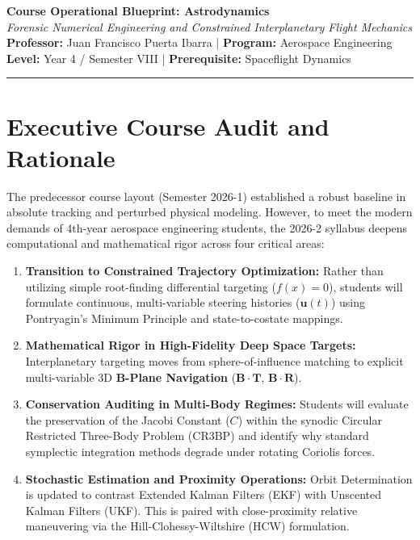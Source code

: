 \documentclass[11pt, letterpaper]{article}
\begin{document}
\begin{center}
    {\LARGE \textbf{\textcolor{UdeAGreen}{Course Operational Blueprint: Astrodynamics}}} \\
    \vspace{0.2cm}
    {\large \textit{Forensic Numerical Engineering and Constrained Interplanetary Flight Mechanics}} \\
    \vspace{0.3cm}
    \textbf{Professor:} Juan Francisco Puerta Ibarra \quad | \quad \textbf{Program:} Aerospace Engineering \\
    \textbf{Level:} Year 4 / Semester VIII \quad | \quad \textbf{Prerequisite:} Spaceflight Dynamics
\end{center}

\hrule
\vspace{0.5cm}

\section{Executive Course Audit and Rationale}
The predecessor course layout (Semester 2026-1) established a robust baseline in absolute tracking and perturbed physical modeling. However, to meet the modern demands of 4th-year aerospace engineering students, the 2026-2 syllabus deepens computational and mathematical rigor across four critical areas:

\begin{enumerate}
    \item \textbf{Transition to Constrained Trajectory Optimization:} Rather than utilizing simple root-finding differential targeting ($f(x) = 0$), students will formulate continuous, multi-variable steering histories ($\mathbf{u}(t)$) using Pontryagin's Minimum Principle and state-to-costate mappings.
    \item \textbf{Mathematical Rigor in High-Fidelity Deep Space Targets:} Interplanetary targeting moves from sphere-of-influence matching to explicit multi-variable 3D \textbf{B-Plane Navigation} ($\mathbf{B}\cdot\mathbf{T}$, $\mathbf{B}\cdot\mathbf{R}$).
    \item \textbf{Conservation Auditing in Multi-Body Regimes:} Students will evaluate the preservation of the Jacobi Constant ($C$) within the synodic Circular Restricted Three-Body Problem (CR3BP) and identify why standard symplectic integration methods degrade under rotating Coriolis forces.
    \item \textbf{Stochastic Estimation and Proximity Operations:} Orbit Determination is updated to contrast Extended Kalman Filters (EKF) with Unscented Kalman Filters (UKF). This is paired with close-proximity relative maneuvering via the Hill-Clohessy-Wiltshire (HCW) formulation.
\end{enumerate}
\end{document}
